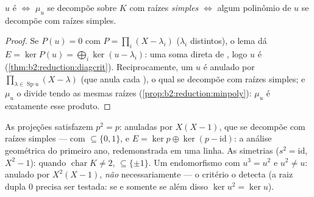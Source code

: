 \begin{corollary}\label{cor:b2:reduction:minpolycrit}
$u$ é  $\iff$ $\mu_u$ se decompõe sobre $K$ com
raízes \emph{simples} $\iff$ algum polinômio  de $u$
se decompõe com raízes simples.
\end{corollary}

\begin{proof}
Se $P(u) = 0$ com $P = \prod_{i}(X - \lambda_i)$ ($\lambda_i$
distintos), o lema dá $E = \ker P(u) = \bigoplus_i \ker(u -
\lambda_i)$: uma soma direta de , logo $u$ é 
(\cref{thm:b2:reduction:diagcrit}). Reciprocamente, um $u$ 
é anulado por $\prod_{\lambda \in \operatorname{Sp}u}(X -
\lambda)$ (que anula cada ), o qual se decompõe com raízes
simples; e $\mu_u$ o divide tendo as mesmas raízes
(\cref{prop:b2:reduction:minpoly}): $\mu_u$ é exatamente esse produto.
\end{proof}

\begin{example}\label{ex:b2:reduction:projections}
As projeções satisfazem $p^2 = p$: anuladas por $X(X-1)$, que se decompõe com raízes
simples ---  com  $\subseteq \{0, 1\}$, e $E =
\ker p \oplus \ker(p - \mathrm{id})$: a análise geométrica do primeiro ano,
redemonstrada em uma linha. As simetrias ($s^2 = \mathrm{id}$,
 $X^2 - 1$):  quando $\operatorname{char} K
\neq 2$,  $\subseteq \{\pm 1\}$. Um endomorfismo com $u^3 =
u^2$ e $u^2 \neq u$: anulado por $X^2(X - 1)$, \emph{não}
necessariamente  --- o critério o detecta (a raiz dupla
$0$ precisa ser testada:  se e somente se além disso $\ker u^2 = \ker
u$).
\end{example}

